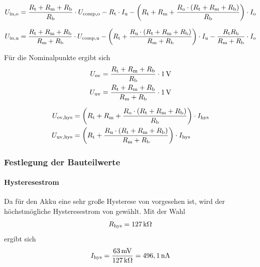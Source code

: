 \begin{align*}
	U_{\mathrm{in,o}} = \frac{R_{\mathrm{t}} + R_{\mathrm{m}} + R_{\mathrm{b}}}{R_{\mathrm{b}}} \cdot U_{\mathrm{comp,o}} - R_{\mathrm{t}} \cdot I_{\mathrm{u}} - \left( R_{\mathrm{t}} + R_{\mathrm{m}} + \frac{R_{\mathrm{o}} \cdot (R_{\mathrm{t}} + R_{\mathrm{m}} + R_{\mathrm{b}})}{R_{\mathrm{b}}} \right) \cdot I_{\mathrm{o}}
\end{align*}


\begin{align*}
	U_{\mathrm{in,u}} = \frac{R_{\mathrm{t}} + R_{\mathrm{m}} + R_{\mathrm{b}}}{R_{\mathrm{m}} + R_{\mathrm{b}}} \cdot U_{\mathrm{comp,u}} - \left( R_{\mathrm{t}} + \frac{R_{\mathrm{u}} \cdot (R_{\mathrm{t}} + R_{\mathrm{m}} + R_{\mathrm{b}})}{R_{\mathrm{m}} + R_{\mathrm{b}}} \right) \cdot I_{\mathrm{u}} - \frac{R_{\mathrm{t}} R_{\mathrm{b}}}{R_{\mathrm{m}} + R_{\mathrm{b}}} \cdot I_{\mathrm{o}}
\end{align*}


Für die Nominalpunkte ergibt sich
\begin{align*}
	U_{\mathrm{ov}} & = \frac{R_{\mathrm{t}} + R_{\mathrm{m}} + R_{\mathrm{b}}}{R_{\mathrm{b}}} \cdot 1\,\mathrm{V} \\
	U_{\mathrm{uv}} & = \frac{R_{\mathrm{t}} + R_{\mathrm{m}} + R_{\mathrm{b}}}{R_{\mathrm{m}} + R_{\mathrm{b}}} \cdot 1\,\mathrm{V}
\end{align*}

\begin{align*}
	U_{\mathrm{ov,hys}} & = \left( R_{\mathrm{t}} + R_{\mathrm{m}} + \frac{R_{\mathrm{o}} \cdot (R_{\mathrm{t}} + R_{\mathrm{m}} + R_{\mathrm{b}})}{R_{\mathrm{b}}} \right) \cdot I_{\mathrm{hys}} \\
	U_{\mathrm{uv,hys}} & = \left( R_{\mathrm{t}} + \frac{R_{\mathrm{u}} \cdot (R_{\mathrm{t}} + R_{\mathrm{m}} + R_{\mathrm{b}})}{R_{\mathrm{m}} + R_{\mathrm{b}}} \right) \cdot I_{\mathrm{hys}}
\end{align*}



\subsubsection{Festlegung der Bauteilwerte}

\paragraph{Hysteresestrom}

Da für den Akku eine sehr große Hysterese von  vorgesehen ist, wird der höchstmögliche Hysteresestrom von  gewählt. Mit der Wahl
\begin{align*}
	R_{\mathrm{hys}} = 127\,\mathrm{k\Omega}
\end{align*}
ergibt sich 
\begin{align*}
	I_{\mathrm{hys}} = \frac{63\,\mathrm{mV}}{127\,\mathrm{k\Omega}} = 496,1\,\mathrm{nA}
\end{align*}



